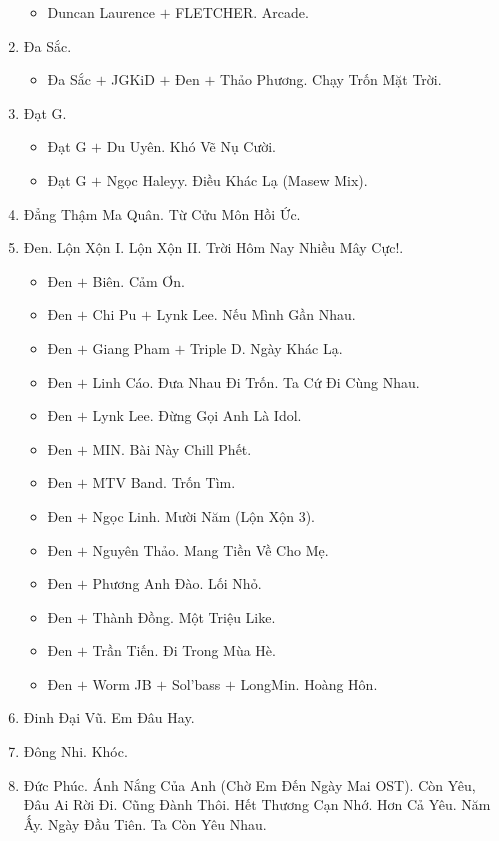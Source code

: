 \documentclass{article}
\begin{document}
\begin{enumerate}
\begin{itemize}
		\item {\sc Duncan Laurence $+$ FLETCHER.} Arcade.
	\end{itemize}
	\item {\sc Đa Sắc.}
	\begin{itemize}
		\item {\sc Đa Sắc $+$ JGKiD $+$ Đen $+$ Thảo Phương.} Chạy Trốn Mặt Trời.
	\end{itemize}
	\item {\sc Đạt G.}
	\begin{itemize}
		\item {\sc Đạt G $+$ Du Uyên.} Khó Vẽ Nụ Cười.
		\item {\sc Đạt G $+$ Ngọc Haleyy.} Điều Khác Lạ (Masew Mix).
	\end{itemize}
	\item {\sc Đẳng Thậm Ma Quân.} Từ Cửu Môn Hồi Ức.
	\item {\sc Đen.} Lộn Xộn I. Lộn Xộn II. Trời Hôm Nay Nhiều Mây Cực!. 
	\begin{itemize}
		\item {\sc Đen $+$ Biên.} Cảm Ơn.
		\item {\sc Đen $+$ Chi Pu $+$ Lynk Lee.} Nếu Mình Gần Nhau.
		\item {\sc Đen $+$ Giang Pham $+$ Triple D.} Ngày Khác Lạ.
		\item {\sc Đen $+$ Linh Cáo.} Đưa Nhau Đi Trốn. Ta Cứ Đi Cùng Nhau.
		\item {\sc Đen $+$ Lynk Lee.} Đừng Gọi Anh Là Idol.
		\item {\sc Đen $+$ MIN.} Bài Này Chill Phết.
		\item {\sc Đen $+$ MTV Band.} Trốn Tìm.
		\item {\sc Đen $+$ Ngọc Linh.} Mười Năm (Lộn Xộn 3).
		\item {\sc Đen $+$ Nguyên Thảo.} Mang Tiền Về Cho Mẹ.
		\item {\sc Đen $+$ Phương Anh Đào.} Lối Nhỏ.
		\item {\sc Đen $+$ Thành Đồng.} Một Triệu Like.
		\item {\sc Đen $+$ Trần Tiến.} Đi Trong Mùa Hè.
		\item {\sc Đen $+$ Worm JB $+$ Sol'bass $+$ LongMin.} Hoàng Hôn.
	\end{itemize}
	\item {\sc Đinh Đại Vũ.} Em Đâu Hay.
	\item {\sc Đông Nhi.} Khóc.
	\item {\sc Đức Phúc.} Ánh Nắng Của Anh (Chờ Em Đến Ngày Mai OST). Còn Yêu, Đâu Ai Rời Đi. Cũng Đành Thôi. Hết Thương Cạn Nhớ. Hơn Cả Yêu. Năm Ấy. Ngày Đầu Tiên. Ta Còn Yêu Nhau.

\end{enumerate}
\end{document}
